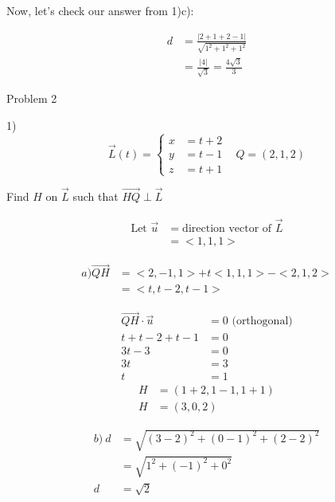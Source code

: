 \documentclass{article}
\begin{document}
\newpage

\begin{text}
\indent Now, let's check our answer from 1)c):
\end{text}

\begin{align*}
d &= \frac{| 2 + 1 + 2 - 1 |}{\sqrt{1^2 + 1^2 + 1^2}} \\
&= \frac{| 4 |}{\sqrt{3}} = \frac{4\sqrt{3}}{3}
\end{align*}



\begin{text}
Problem 2 \\
\end{text}

1)
\[\vec{L}(t) = \left\{
  \begin{array}{lr}
    x &= t + 2 \\
    y &= t - 1 \\
    z &= t + 1
  \end{array}
\right.
\;\;\;
Q = (2,1,2)
\]

\begin{center}
Find $H$ on $\vec{L}$ such that $\vec{HQ} \perp \vec{L}$
\end{center}

\begin{align*}
\text{Let } \vec{u} &= \text{direction vector of } \vec{L} \\
&= <1,1,1>
\end{align*}

\begin{align*}
a) \vec{QH} &= <2, -1, 1> + t<1,1,1> - <2,1,2> \\
&= <t, t-2, t-1>
\end{align*}

\begin{align*}
\vec{QH} \cdot \vec{u} &= 0  \text{ (orthogonal)}\\
t + t - 2 + t -1 &= 0 \\
3t - 3 &= 0 \\
3t &= 3 \\
t &= 1
\end{align*}
\begin{align*}
H &= (1+2, 1-1, 1+1) \\
H &= (3, 0, 2)
\end{align*}

\begin{align*}
b) \: d &= \sqrt{(3-2)^2 + (0-1)^2 + (2-2)^2} \\
&= \sqrt{1^2 + (-1)^2 + 0^2} \\
d &= \sqrt{2}
\end{align*}
\end{document}
